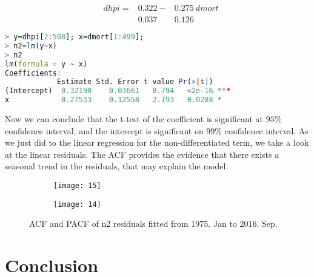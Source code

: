 \documentclass[12pt,letterpaper]{article}
\begin{document}
\begin{equation}
\begin{aligned}
&dhpi =&0.322  -  &0.275 { \ }dmort \\
&         & 0.037   \quad&0.126
\end{aligned}
\end{equation}

{\footnotesize
\begin{lstlisting}[language=R]
> y=dhpi[2:500]; x=dmort[1:499];
> n2=lm(y~x)
> n2
lm(formula = y ~ x)
Coefficients:
            Estimate Std. Error t value Pr(>|t|)    
(Intercept)  0.32190    0.03661   8.794   <2e-16 ***
x            0.27533    0.12558   2.193   0.0288 *  
\end{lstlisting}
}

Now we can conclude that the t-test of the coefficient is significant at $95\%$ confidence interval, and the intercept is significant on $99\%$ confidence interval.
As we just did to the linear regression for the non-differentiated term, we take a look at the linear residuals.
The ACF provides the evidence that there exists a seasonal trend in the residuals, that may explain the model.

\begin{figure*}[h!]
\begin{subfigure}[b]{0.4\textwidth}
\begin{center}
 \texttt{[image: 15]}
 \vspace{-0.4cm}
\end{center}
\end{subfigure}
\qquad
\qquad
\begin{subfigure}[b]{0.4\textwidth}
\begin{center}
 \texttt{[image: 14]}
 \vspace{-0.4cm}
\end{center}
\end{subfigure}
 \vspace{-.1cm}
 \caption{ ACF and PACF of n2 residuals fitted from 1975. Jan to 2016. Sep.}
      \label{fig:time}
\vspace{-.25cm}
\end{figure*}



\section{Conclusion}
\end{document}
